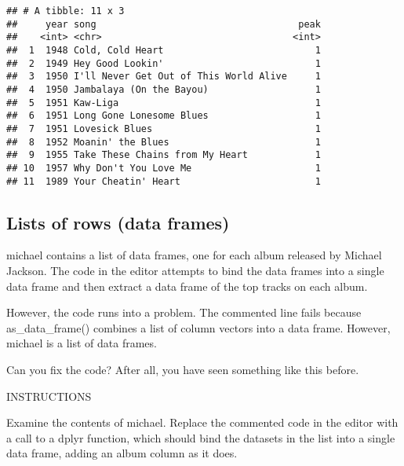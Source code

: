 \documentclass[]{article}
\newenvironment{Shaded}{\begin{snugshade}}{\end{snugshade}}
\newcommand{\CommentTok}[1]{\textcolor[rgb]{0.56,0.35,0.01}{\textit{#1}}}
\begin{document}
\begin{verbatim}
## # A tibble: 11 x 3
##     year song                                    peak
##    <int> <chr>                                  <int>
##  1  1948 Cold, Cold Heart                           1
##  2  1949 Hey Good Lookin'                           1
##  3  1950 I'll Never Get Out of This World Alive     1
##  4  1950 Jambalaya (On the Bayou)                   1
##  5  1951 Kaw-Liga                                   1
##  6  1951 Long Gone Lonesome Blues                   1
##  7  1951 Lovesick Blues                             1
##  8  1952 Moanin' the Blues                          1
##  9  1955 Take These Chains from My Heart            1
## 10  1957 Why Don't You Love Me                      1
## 11  1989 Your Cheatin' Heart                        1
\end{verbatim}

\subsection{Lists of rows (data
frames)}\label{lists-of-rows-data-frames}

michael contains a list of data frames, one for each album released by
Michael Jackson. The code in the editor attempts to bind the data frames
into a single data frame and then extract a data frame of the top tracks
on each album.

However, the code runs into a problem. The commented line fails because
as\_data\_frame() combines a list of column vectors into a data frame.
However, michael is a list of data frames.

Can you fix the code? After all, you have seen something like this
before.

INSTRUCTIONS

Examine the contents of michael. Replace the commented code in the
editor with a call to a dplyr function, which should bind the datasets
in the list into a single data frame, adding an album column as it does.

\begin{Shaded}
\end{Shaded}
\end{document}
